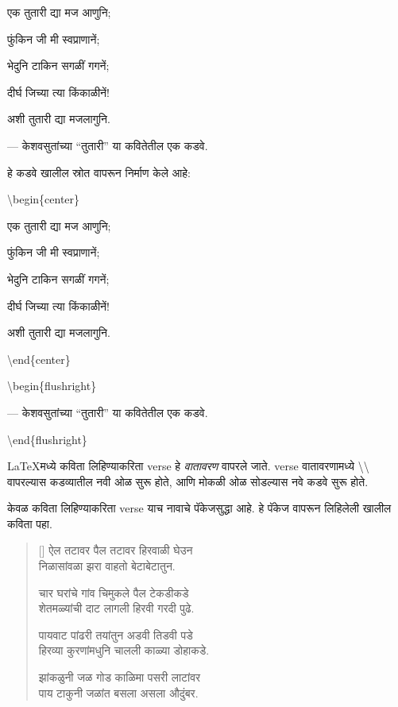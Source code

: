 \documentclass[11pt]{article}
\newcommand{\7}{\textbackslash}
\newcommand{\attrib}[1]{%
 \nopagebreak{\raggedleft\normalfont #1\par}}%
\begin{document}
\begin{center}
 एक तुतारी द्या मज आणुनि;

फुंकिन जी मी स्वप्राणानें;

भेदुनि टाकिन सगळीं गगनें;

दीर्घ जिच्या त्या किंकाळीनें!

अशी तुतारी द्या मजलागुनि.
\end{center}

\begin{flushright}
--- केशवसुतांच्या ``तुतारी'' या कवितेतील एक कडवे. 
\end{flushright}

हे कडवे खालील स्रोत वापरून निर्माण केले आहे:
\medskip

\textenglish{\7begin\{center\}}

 एक तुतारी द्या मज आणुनि;
\vspace{0.2in}

फुंकिन जी मी स्वप्राणानें;
\vspace{0.2in}

भेदुनि टाकिन सगळीं गगनें;
\vspace{0.2in}

दीर्घ जिच्या त्या किंकाळीनें!
\vspace{0.2in}

अशी तुतारी द्या मजलागुनि.

\textenglish{\7end\{center\}}

\textenglish{\7begin\{flushright\}}

--- केशवसुतांच्या ``तुतारी'' या कवितेतील एक कडवे. 

\textenglish{\7end\{flushright\}}

\bigskip


{\LaTeX}मध्ये कविता लिहिण्याकरिता \textenglish{verse} हे \emph{वातावरण}
वापरले जाते. \textenglish{verse} वातावरणामध्ये \7\7 वापरल्यास कडव्यातील नवी ओळ सुरू होते, आणि मोकळी ओळ सोडल्यास नवे कडवे सुरू होते.

केवळ कविता लिहिण्याकरिता \textenglish{verse} याच नावाचे पॅकेजसुद्धा
आहे. हे पॅकेज वापरून लिहिलेली खालील कविता पहा. \label{page:audumbar}

\settowidth{\versewidth}{शेतमळ्यांची दाट लागली हिरवी गरदी पुढे.}
\begin{verse}[\versewidth]
 ऐल तटावर पैल तटावर हिरवाळी घेउन\\
निळासांवळा झरा वाहतो बेटाबेटातुन.

चार घरांचे गांव चिमुकले पैल टेकडीकडे\\
शेतमळ्यांची दाट लागली हिरवी गरदी पुढे.

पायवाट पांढरी तयांतुन अडवी तिडवी पडे\\
हिरव्या कुरणांमधुनि चालली काळ्या डोहाकडे.

झांकळुनी जळ गोड काळिमा पसरी लाटांवर\\
पाय टाकुनी जळांत बसला असला औदुंबर.
\end{verse}
\attrib{बालकवी}
\bigskip
\end{document}
